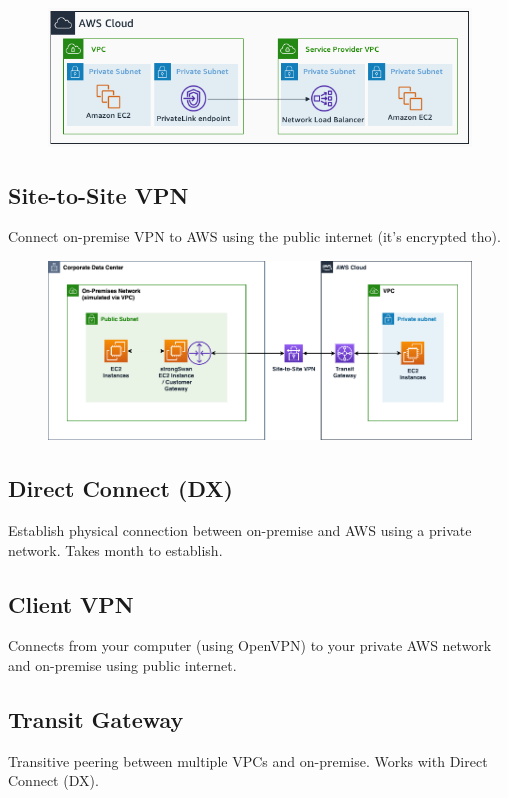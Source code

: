 \begin{figure}[h]
    \includegraphics[scale=0.6]{vpc-networking/privatelink}
    \centering
    \label{fig:vpc-privatelink}
\end{figure}

\subsection{Site-to-Site VPN}\label{subsec:site-to-site-vpn}
Connect on-premise VPN to AWS using the public internet (it's encrypted tho).

\begin{figure}[h]
    \includegraphics[scale=0.4]{vpc-networking/site-to-site}
    \centering
    \label{fig:vpc-site-to-site}
\end{figure}


\subsection{Direct Connect (DX)}\label{subsec:direct-connect}
Establish physical connection between on-premise and AWS using a private network\@.
Takes month to establish\@.

\subsection{Client VPN}\label{subsec:client-vpn}
Connects from your computer (using OpenVPN) to your private AWS network and on-premise using public internet\@.

\subsection{Transit Gateway}\label{subsec:transit-gateway}
Transitive peering between multiple VPCs and on-premise.
Works with Direct Connect (DX).